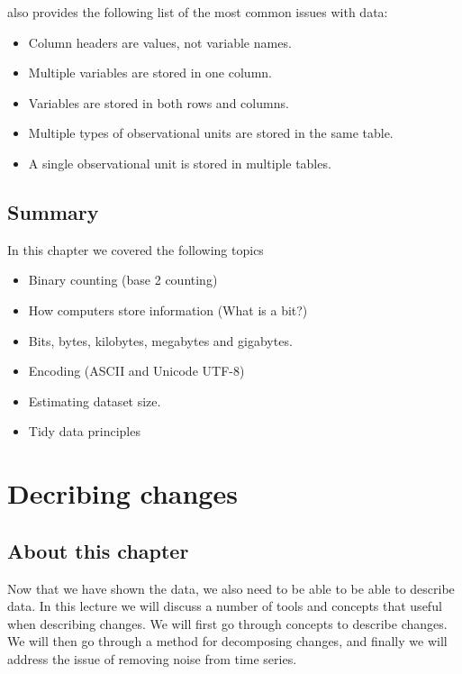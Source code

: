 \documentclass[]{book}
\providecommand{\tightlist}{%
  \setlength{\itemsep}{0pt}\setlength{\parskip}{0pt}}
\begin{document}
\citep{wickham2014tidy} also provides the following list of the most common issues with data:

\begin{itemize}
\tightlist
\item
  Column headers are values, not variable names.
\item
  Multiple variables are stored in one column.
\item
  Variables are stored in both rows and columns.
\item
  Multiple types of observational units are stored in the same table.
\item
  A single observational unit is stored in multiple tables.
\end{itemize}

\hypertarget{summary-9}{%
\section{Summary}\label{summary-9}}

In this chapter we covered the following topics

\begin{itemize}
\tightlist
\item
  Binary counting (base 2 counting)
\item
  How computers store information (What is a bit?)
\item
  Bits, bytes, kilobytes, megabytes and gigabytes.
\item
  Encoding (ASCII and Unicode UTF-8)
\item
  Estimating dataset size.
\item
  Tidy data principles
\end{itemize}

\hypertarget{decribing-changes}{%
\chapter{Decribing changes}\label{decribing-changes}}

\hypertarget{about-this-chapter-10}{%
\section{About this chapter}\label{about-this-chapter-10}}

Now that we have shown the data, we also need to be able to be able to describe data. In this lecture we will discuss a number of tools and concepts that useful when describing changes. We will first go through concepts to describe changes. We will then go through a method for decomposing changes, and finally we will address the issue of removing noise from time series.
\end{document}
